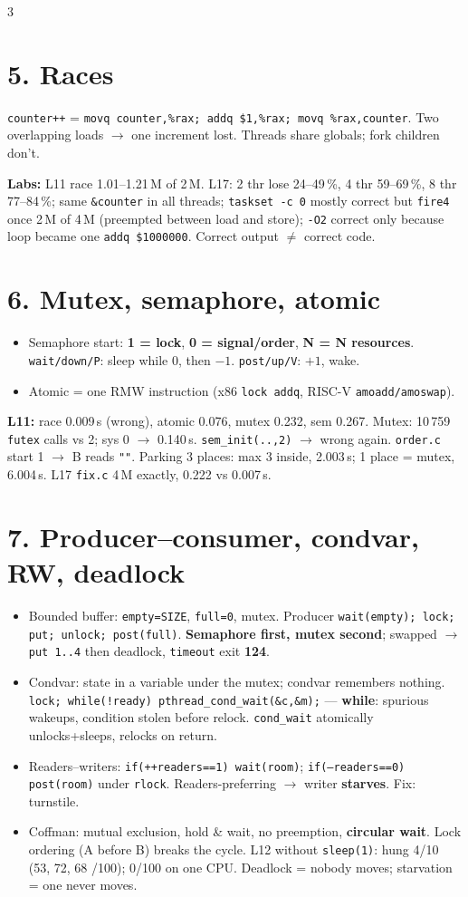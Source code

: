 \documentclass[9pt]{extarticle}
\newcommand{\cc}[1]{\texttt{#1}}
\newcommand{\ra}{$\rightarrow$}
\begin{document}
\begin{multicols*}{3}
\section{5. Races}
\cc{counter++} = \cc{movq counter,\%rax; addq \$1,\%rax; movq \%rax,counter}. Two overlapping loads \ra{} one increment lost. Threads share globals; fork children don't.

\textbf{Labs:} L11 race 1.01--1.21\,M of 2\,M. L17: 2 thr lose 24--49\,\%, 4 thr 59--69\,\%, 8 thr 77--84\,\%; same \cc{\&counter} in all threads; \cc{taskset -c 0} mostly correct but \cc{fire4} once 2\,M of 4\,M (preempted between load and store); \cc{-O2} correct only because loop became one \cc{addq \$1000000}. Correct output $\neq$ correct code.

\section{6. Mutex, semaphore, atomic}
\begin{itemize}
\item Semaphore start: \textbf{1 = lock}, \textbf{0 = signal/order}, \textbf{N = N resources}. \cc{wait/down/P}: sleep while 0, then $-1$. \cc{post/up/V}: $+1$, wake.
\item Atomic = one RMW instruction (x86 \cc{lock addq}, RISC-V \cc{amoadd/amoswap}).
\end{itemize}
\textbf{L11:} race 0.009\,s (wrong), atomic 0.076, mutex 0.232, sem 0.267. Mutex: 10\,759 \cc{futex} calls vs 2; sys 0 \ra{} 0.140\,s. \cc{sem\_init(..,2)} \ra{} wrong again. \cc{order.c} start 1 \ra{} B reads \cc{""}. Parking 3 places: max 3 inside, 2.003\,s; 1 place = mutex, 6.004\,s. L17 \cc{fix.c} 4\,M exactly, 0.222 vs 0.007\,s.

\section{7. Producer--consumer, condvar, RW, deadlock}
\begin{itemize}
\item Bounded buffer: \cc{empty=SIZE}, \cc{full=0}, mutex. Producer \cc{wait(empty); lock; put; unlock; post(full)}. \textbf{Semaphore first, mutex second}; swapped \ra{} \cc{put 1..4} then deadlock, \cc{timeout} exit \textbf{124}.
\item Condvar: state in a variable under the mutex; condvar remembers nothing. \cc{lock; while(!ready) pthread\_cond\_wait(\&c,\&m);} --- \textbf{while}: spurious wakeups, condition stolen before relock. \cc{cond\_wait} atomically unlocks+sleeps, relocks on return.
\item Readers--writers: \cc{if(++readers==1) wait(room)}; \cc{if(--readers==0) post(room)} under \cc{rlock}. Readers-preferring \ra{} writer \textbf{starves}. Fix: turnstile.
\item Coffman: mutual exclusion, hold \& wait, no preemption, \textbf{circular wait}. Lock ordering (A before B) breaks the cycle. L12 without \cc{sleep(1)}: hung 4/10 (53, 72, 68 /100); 0/100 on one CPU. Deadlock = nobody moves; starvation = one never moves.
\end{itemize}


\end{multicols*}
\end{document}
